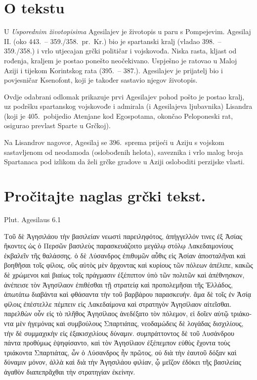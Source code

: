 


\section*{O tekstu}

U \textit{Usporednim životopisima} Agesilajev je životopis u paru s Pompejevim. Agesilaj II. (oko 443.\ – 359./358.\ pr.~Kr.) bio je spartanski kralj (vladao 398.\ – 359./358.) i vrlo utjecajan grčki političar i vojskovođa. Niska rasta, kljast od rođenja, kraljem je postao ponešto neočekivano. Uspješno je ratovao u Maloj Aziji i tijekom Korintskog rata (395.\ – 387.). Agesilajev je prijatelj bio i povjesničar Ksenofont, koji je također sastavio njegov životopis. 

Ovdje odabrani odlomak prikazuje prvi Agesilajev pohod pošto je postao kralj, uz podršku spartanskog vojskovođe i admirala (i Agesilajeva ljubavnika) Lisandra (koji je 405.\ pobijedio Atenjane kod Egospotama, okončao Peloponeski rat, osigurao prevlast Sparte u Grčkoj).

Na Lisandrov nagovor, Agesilaj se 396.\ sprema prijeći u Aziju s vojskom sastavljenom od neodamoda (oslobođenih helota), saveznika i vrlo malog broja Spartanaca pod izlikom da želi grčke gradove u Aziji osloboditi perzijske vlasti.


\section*{Pročitajte naglas grčki tekst.}
Plut. Agesilaus 6.1

\medskip

{\large
\begin{greek}
\noindent Τοῦ δὲ Ἀγησιλάου τὴν βασιλείαν νεωστὶ παρειληφότος, ἀπήγγελλόν τινες ἐξ Ἀσίας ἥκοντες ὡς ὁ Περσῶν βασιλεὺς παρασκευάζοιτο μεγάλῳ στόλῳ Λακεδαιμονίους ἐκβαλεῖν τῆς θαλάσσης. ὁ δὲ Λύσανδρος ἐπιθυμῶν αὖθις εἰς Ἀσίαν ἀποσταλῆναι καὶ βοηθῆσαι τοῖς φίλοις, οὓς αὐτὸς μὲν ἄρχοντας καὶ κυρίους τῶν πόλεων ἀπέλιπε, κακῶς δὲ χρώμενοι καὶ βιαίως τοῖς πράγμασιν ἐξέπιπτον ὑπὸ τῶν πολιτῶν καὶ ἀπέθνησκον, ἀνέπεισε τὸν Ἀγησίλαον ἐπιθέσθαι τῇ στρατείᾳ καὶ προπολεμῆσαι τῆς Ἑλλάδος, ἀπωτάτω διαβάντα καὶ φθάσαντα τὴν τοῦ βαρβάρου παρασκευήν. ἅμα δὲ τοῖς ἐν Ἀσίᾳ φίλοις ἐπέστελλε πέμπειν εἰς Λακεδαίμονα καὶ στρατηγὸν Ἀγησίλαον αἰτεῖσθαι. παρελθὼν οὖν εἰς τὸ πλῆθος Ἀγησίλαος ἀνεδέξατο τὸν πόλεμον, εἰ δοῖεν αὐτῷ τριάκοντα μὲν ἡγεμόνας καὶ συμβούλους Σπαρτιάτας, νεοδαμώδεις δὲ λογάδας δισχιλίους, τὴν δὲ συμμαχικὴν εἰς ἑξακισχιλίους δύναμιν. συμπράττοντος δὲ τοῦ Λυσάνδρου πάντα προθύμως ἐψηφίσαντο, καὶ τὸν Ἀγησίλαον ἐξέπεμπον εὐθὺς ἔχοντα τοὺς τριάκοντα Σπαρτιάτας, ὧν ὁ Λύσανδρος ἦν πρῶτος, οὐ διὰ τὴν ἑαυτοῦ δόξαν καὶ δύναμιν μόνον, ἀλλὰ καὶ διὰ τὴν Ἀγησιλάου φιλίαν, ᾧ μεῖζον ἐδόκει τῆς βασιλείας ἀγαθὸν διαπεπρᾶχθαι τὴν στρατηγίαν ἐκείνην.

\end{greek}
}

